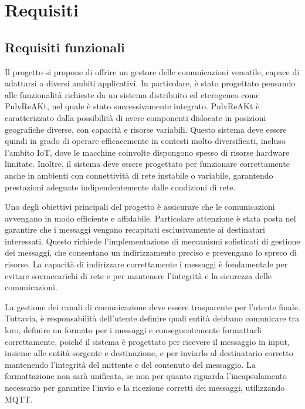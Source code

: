 \documentclass[12pt,a4paper,openright,twoside]{book}
\begin{document}
\chapter{Requisiti}\label{chap:Requisiti}

\section{Requisiti funzionali}

Il progetto si propone di offrire un gestore delle comunicazioni versatile, capace di adattarsi a diversi ambiti applicativi. 
In particolare, è stato progettato pensando alle funzionalità richieste da un sistema distribuito ed eterogeneo come PulvReAKt, nel quale è stato successivamente integrato. 
PulvReAKt è caratterizzato dalla possibilità di avere componenti dislocate in posizioni geografiche diverse, con capacità e risorse variabili. 
Questo sistema deve essere quindi in grado di operare efficacemente in contesti molto diversificati, incluso l'ambito \ac{IoT}, dove le macchine coinvolte dispongono 
spesso di risorse hardware limitate. Inoltre, il sistema deve essere progettato per funzionare correttamente anche in ambienti con connettività di rete instabile o variabile, 
garantendo prestazioni adeguate indipendentemente dalle condizioni di rete.

Uno degli obiettivi principali del progetto è assicurare che le comunicazioni avvengano in modo efficiente e affidabile. Particolare attenzione è stata posta nel garantire 
che i messaggi vengano recapitati esclusivamente ai destinatari interessati. Questo richiede l'implementazione di meccanismi sofisticati di gestione dei messaggi, 
che consentano un indirizzamento preciso e prevengano lo spreco di risorse. La capacità di indirizzare correttamente i messaggi è fondamentale per evitare sovraccarichi 
di rete e per mantenere l'integrità e la sicurezza delle comunicazioni.

La gestione dei canali di comunicazione deve essere trasparente per l'utente finale. Tuttavia, è responsabilità dell'utente definire quali entità debbano comunicare
tra loro, definire un formato per i messaggi e conseguentemente formattarli correttamente, poiché il sistema è progettato per ricevere il messaggio in input, 
insieme alle entità sorgente e destinazione, e per inviarlo al destinatario corretto mantenendo l'integrità del mittente e del contenuto del messaggio. 
La formattazione non sarà unificata, se non per quanto riguarda l'incapsulamento necessario per garantire l'invio e la ricezione corretti dei messaggi, utilizzando \ac{MQTT}.
\end{document}
